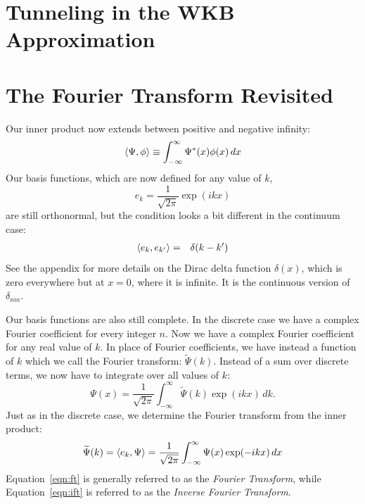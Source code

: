 \documentclass[12pt]{book}
\begin{document}
\section{Tunneling in the WKB Approximation }


\section{The Fourier Transform Revisited}

Our inner product now extends between positive and negative infinity:
\begin{equation}
\braket{\Psi, \phi} \equiv \int_{-\infty}^{\infty} \Psi^*(x) \phi(x) \, dx
\end{equation}
Our basis functions, which are now defined for any value of $k$,
\begin{equation}
e_k = \frac{1}{\sqrt{2\pi}} \exp(i k x)
\end{equation}
are still orthonormal, but the condition looks a bit different in the continuum case:
\begin{eqnarray*}
\braket{e_k, e_{k'}} &=& \delta(k-k')
\end{eqnarray*}
See the appendix for more details on the Dirac delta function $\delta(x)$, which is zero everywhere but at $x=0$, where it is infinite.  It is the continuous version of $\delta_{nm}$.

Our basis functions are also still complete.  In the discrete case we have a complex Fourier coefficient for every integer $n$.   Now we have a complex Fourier coefficient for any real value of $k$.  In place of Fourier coefficients, we have instead a function of $k$ which we call the Fourier transform: $\widetilde{\Psi}(k)$.
Instead of a sum over discrete terms, we now have to integrate over all values of $k$:
\begin{equation} \label{eqn:ift}
\Psi(x) = \frac{1}{\sqrt{2\pi}} \int_{-\infty}^{\infty} \widetilde{\Psi}(k) \exp(ikx) \, dk.
\end{equation}
Just as in the discrete case, we determine the Fourier transform from the inner product:
\begin{equation} \label{eqn:ft}
\widetilde{\Psi}(k) = \braket{e_k, \Psi} = \frac{1}{\sqrt{2\pi}} \int_{-\infty}^{\infty} {\Psi}(x) \exp(-ikx) \, dx
\end{equation}
Equation~\ref{eqn:ft} is generally referred to as the {\em Fourier Transform}, while Equation~\ref{eqn:ift} is referred to as the {\em Inverse Fourier Transform}.
\end{document}
